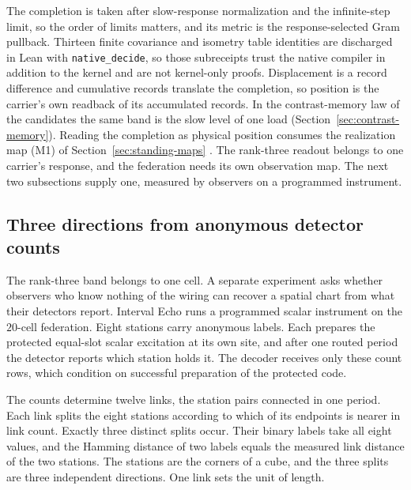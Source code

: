 \documentclass[11pt]{article}
\theoremstyle{definition}
\theoremstyle{remark}
\begin{document}
The completion is taken after slow-response normalization and the
infinite-step limit, so the order of limits matters, and its metric is the
response-selected Gram pullback. Thirteen finite
covariance and isometry table identities are discharged in Lean with
\texttt{native\_decide}, so those subreceipts trust the native compiler in
addition to the kernel and are not kernel-only proofs. Displacement is a
record difference and cumulative records translate the completion, so
position is the carrier's own readback of its accumulated records. In the
contrast-memory law of the candidates the same band is the slow level of one
load (Section~\ref{sec:contrast-memory}). Reading the completion as physical
position consumes the realization map (M1) of Section~\ref{sec:standing-maps}
\cite{ophrepo,ophMicrophysics}. The rank-three readout belongs to one
carrier's response, and the federation needs its own observation map.
The next two subsections supply one, measured by observers on a programmed
instrument.

\subsection{Three directions from anonymous detector counts}
\label{sec:blind-chart}

The rank-three band belongs to one cell. A separate experiment asks
whether observers who know nothing of the wiring can recover a spatial
chart from what their detectors report. Interval Echo runs a programmed
scalar instrument on the $20$-cell federation. Eight stations carry
anonymous labels. Each prepares the protected equal-slot scalar
excitation at its own site, and after one routed period the detector
reports which station holds it. The decoder receives only these count
rows, which condition on successful preparation of the protected code.

The counts determine twelve links, the station pairs connected in one
period. Each link splits the eight stations according to which of its
endpoints is nearer in link count. Exactly three distinct splits occur.
Their binary labels take all eight values, and the Hamming distance of
two labels equals the measured link distance of the two stations. The
stations are the corners of a cube, and the three splits are three
independent directions. One link sets the unit of length.
\end{document}
